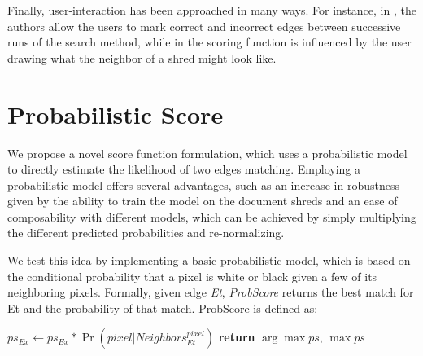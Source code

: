 \documentclass{llncs}
\begin{document}
Finally, user-interaction has been approached in many ways. For instance, in \cite{P5,P10}, the authors allow the users to mark correct and incorrect edges between successive runs of the search method, while in \cite{P14} the scoring function is influenced by the user drawing what the neighbor of a shred might look like.

\section{Probabilistic Score}
We propose a novel score function formulation, which uses a probabilistic model to directly estimate the likelihood of two edges matching. Employing a probabilistic model offers several advantages, such as an increase in robustness given by the ability to train the model on the document shreds and an ease of composability with different models, which can be achieved by simply multiplying the different predicted probabilities and re-normalizing.

We test this idea by implementing a basic probabilistic model, which is based on the conditional probability that a pixel is white or black given a few of its neighboring pixels. Formally, given edge \emph{Et}, \emph{ProbScore} returns the best match for Et and the probability of that match. ProbScore is defined as:
\begin{algorithmic}
   
      \State $ps_{Ex} \gets ps_{Ex} * \Pr(pixel|Neighbors_{Et}^{pixel})$ 
    \EndFor
  \EndFor
   
  \State \textbf{return} $\arg\max ps$, $\max ps$
\EndProcedure
\end{algorithmic}
\end{document}
